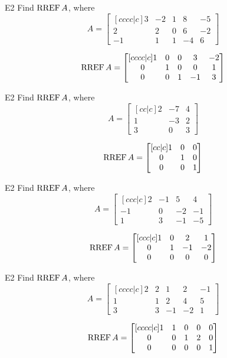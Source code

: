 \begin{problem}{E2}
Find \(\operatorname{RREF} A\), where
\[
  A =
  \begin{bmatrix}[cccc|c]
    3 & -2 & 1 & 8 & -5 \\
    2 & 2 & 0 & 6 & -2 \\
    -1 & 1 & 1 & -4 & 6
  \end{bmatrix}
\]
\end{problem}
\begin{solution}
\[
  \operatorname{RREF} A =
  \begin{bmatrix}[cccc|c]
    1 & 0 & 0 & 3 & -2 \\
    0 & 1 & 0 & 0 & 1 \\
    0 & 0 & 1 & -1 & 3
  \end{bmatrix}
\]
\end{solution}

\begin{problem}{E2}
Find \(\operatorname{RREF} A\), where
\[
  A =
  \begin{bmatrix}[cc|c]
    2 & -7 & 4 \\
    1 & -3 & 2 \\
    3 & 0 & 3
  \end{bmatrix}
\]
\end{problem}
\begin{solution}
\[
  \operatorname{RREF} A =
  \begin{bmatrix}[cc|c]
    1 & 0 & 0 \\
    0 & 1 & 0 \\
    0 & 0 & 1
  \end{bmatrix}
\]
\end{solution}

\begin{problem}{E2}
Find \(\operatorname{RREF} A\), where
\[
  A =
  \begin{bmatrix}[ccc|c]
    2 & -1 & 5 & 4 \\
    -1 & 0 & -2 & -1 \\
    1 & 3 & -1 & -5
  \end{bmatrix}
\]
\end{problem}
\begin{solution}
\[
  \operatorname{RREF} A =
  \begin{bmatrix}[ccc|c]
    1 & 0 & 2 & 1 \\
    0 & 1 & -1 & -2 \\
    0 & 0 & 0 & 0
  \end{bmatrix}
\]
\end{solution}

\begin{problem}{E2}
Find \(\operatorname{RREF} A\), where
\[
  A =
  \begin{bmatrix}[cccc|c]
    2 & 2 & 1 & 2 & -1 \\
    1 & 1 & 2 & 4 & 5 \\
    3 & 3 & -1 & -2 & 1
  \end{bmatrix}
\]
\end{problem}
\begin{solution}
\[
  \operatorname{RREF} A =
  \begin{bmatrix}[cccc|c]
    1 & 1 & 0 & 0 & 0 \\
    0 & 0 & 1 & 2 & 0 \\
    0 & 0 & 0 & 0 & 1
  \end{bmatrix}
\]
\end{solution}
